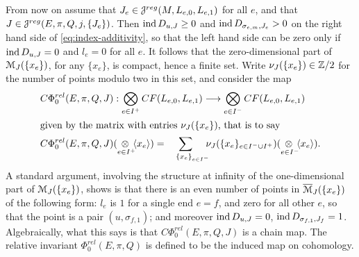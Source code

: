 \documentclass[10pt,letterpaper]{article}
\begin{document}
From now on assume that $J_e \in \mathcal{J}^{reg}(M,L_{e,0},L_{e,1})$ for all $e$, and
that $J \in \mathcal{J}^{reg}(E,\pi,Q,j,\{J_e\})$. Then $\mathrm{ind}\,D_{u,J} \geq 0$ and
$\mathrm{ind}\,D_{\sigma_{e,m},J_e} > 0$ on the right hand side of
\eqref{eq:index-additivity}, so that the left hand side can be zero only if
$\mathrm{ind}\,D_{u,J} = 0$ and $l_e = 0$ for all $e$. It follows that the
zero-dimensional part of $\mathcal{M}_J(\{x_e\})$, for any $\{x_e\}$, is compact, hence
a finite set. Write $\nu_J(\{x_e\}) \in \mathbb{Z}/2$ for the number of points modulo
two in this set, and consider the map
\begin{align} \label{eq:relative-chain-map}
 & C\Phi_0^{rel}(E,\pi,Q,J) : \bigotimes_{e \in I^+} CF(L_{e,0},L_{e,1})
 \longrightarrow \bigotimes_{e \in I^-} CF(L_{e,0},L_{e,1}) \\
 \intertext{given by the matrix with entries $\nu_J(\{x_e\})$, that is to
 say}
\notag
 & C\Phi_0^{rel}(E,\pi,Q,J)(\underset{e \in I^+\!\!}{\otimes} \gen{x_e}) =
 \sum_{\;\;\;\;\{x_e\}_{e \in I^-}\!\!\!\!} \nu_J(\{x_e\}_{e \in I^- \cup I^+})
 (\underset{e \in I^-\!\!}{\otimes} \gen{x_e}).
\end{align}
A standard argument, involving the structure at infinity of the one-dimensional
part of $\mathcal{M}_J(\{x_e\})$, shows is that there is an even number of points in
$\overline{\mathcal{M}}_J(\{x_e\})$ of the following form: $l_e$ is $1$ for a single
end $e=f$, and zero for all other $e$, so that the point is a pair
$(u,\sigma_{f,1})$; and moreover $\mathrm{ind}\,D_{u,J} = 0$, $\mathrm{ind} \,
D_{\sigma_{f,1},J_f} = 1$. Algebraically, what this says is that
$C\Phi_0^{rel}(E,\pi,Q,J)$ is a chain map. The relative invariant
$\Phi_0^{rel}(E,\pi,Q)$ is defined to be the induced map on cohomology.
\end{document}
